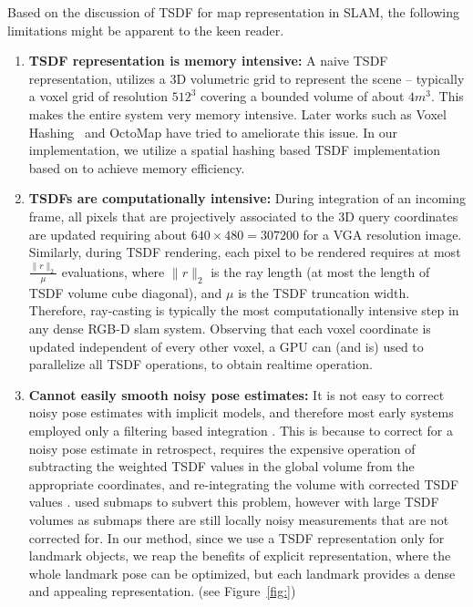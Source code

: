 Based on the discussion of TSDF for map representation in SLAM, the following limitations might be apparent to the keen reader.
\begin{enumerate}
    \item \textbf{TSDF representation is memory intensive:} A naive TSDF representation, utilizes a 3D volumetric grid to represent the scene -- typically  a voxel grid of resolution $512^3$ covering a bounded volume of about $4m^3$. This makes the entire system very memory intensive. Later works such as Voxel Hashing~\cite{neissner} and OctoMap \cite{hornungOctoMapEfficientProbabilistic2013} have tried to ameliorate this issue. In our implementation, we utilize a spatial hashing based TSDF implementation based on \cite{dongGPUAcceleratedRobust2019} to achieve memory efficiency.
    \item \textbf{TSDFs are computationally intensive:} During integration of an incoming frame, all pixels that are projectively associated to the 3D query coordinates are updated requiring about $640\times 480 = 307200$ for a VGA resolution image. Similarly, during TSDF rendering, each pixel to be rendered requires at most $\frac{\|r\|_2}{\mu}$ evaluations, where $\|r\|_2$ is the ray length (at most the length of TSDF volume cube diagonal), and $\mu$ is the TSDF truncation width. Therefore, ray-casting is typically the most computationally intensive step in any dense RGB-D slam system. Observing that each voxel coordinate is updated independent of every other voxel, a GPU can (and is) used to parallelize all TSDF operations, to obtain realtime operation.
    \item \textbf{Cannot easily smooth noisy pose estimates:} It is not easy to correct noisy pose estimates with implicit models, and therefore most early systems employed only a filtering based integration \cite{newcombeKinectFusionRealtimeDense2011}. This is because to correct for a noisy pose estimate in retrospect, requires the expensive operation of subtracting the weighted TSDF values in the global volume from the appropriate coordinates, and re-integrating the volume with corrected TSDF values \cite{daiBundleFusionRealtimeGlobally2017}. \cite{whelanKintinuousSpatiallyExtended} used submaps to subvert this problem, however with large TSDF volumes as submaps there are still locally noisy measurements that are not corrected for. In our method, since we use a TSDF representation only for landmark objects, we reap the benefits of explicit representation, where the whole landmark pose can be optimized, but each landmark provides a dense and appealing representation. (see Figure~\ref{fig:})
\end{enumerate}

